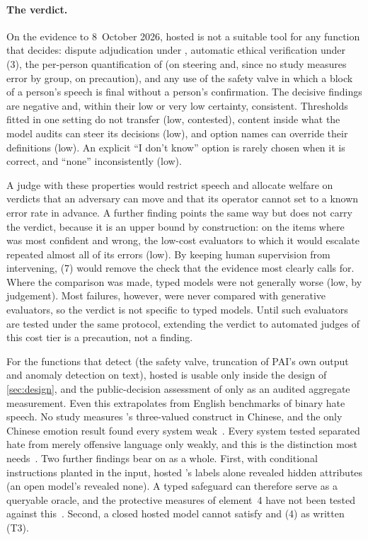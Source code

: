 \paragraph{The verdict.}
On the evidence to 8~October 2026, hosted \jev{} is not a suitable tool for any \pol{} function that decides: dispute adjudication under , automatic ethical verification under (3), the per-person quantification of  (on steering and, since no study measures error by group, on precaution), and any use of the safety valve in which a block of a person's speech is final without a person's confirmation.
The decisive findings are negative and, within their low or very low certainty, consistent.
Thresholds fitted in one setting do not transfer (low, contested), content inside what the model audits can steer its decisions (low), and option names can override their definitions (low).
An explicit ``I don't know'' option is rarely chosen when it is correct, and ``none'' inconsistently (low).

A judge with these properties would restrict speech and allocate welfare on verdicts that an adversary can move and that its operator cannot set to a known error rate in advance.
A further finding points the same way but does not carry the verdict, because it is an upper bound by construction: on the items where \jev{} was most confident and wrong, the low-cost evaluators to which it would escalate repeated almost all of its errors (low).
By keeping human supervision from intervening, (7) would remove the check that the evidence most clearly calls for.
Where the comparison was made, typed models were not generally worse (low, by judgement).
Most failures, however, were never compared with generative evaluators, so the verdict is not specific to typed models.
Until such evaluators are tested under the same protocol, extending the verdict to automated judges of this cost tier is a precaution, not a finding.

For the functions that detect (the safety valve, truncation of PAI's own output and anomaly detection on text), hosted \jev{} is usable only inside the design of \cref{sec:design}, and the public-decision assessment of  only as an audited aggregate measurement.
Even this extrapolates from English benchmarks of binary hate speech.
No study measures \pol{}'s three-valued construct in Chinese, and the only Chinese emotion result found every system weak~\cite{arx08829}.
Every system tested separated hate from merely offensive language only weakly, and this is the distinction  most needs~\cite{arx03324}.
Two further findings bear on \pol{} as a whole.
First, with conditional instructions planted in the input, hosted \jev{}'s labels alone revealed hidden attributes (an open model's revealed none).
A typed safeguard can therefore serve as a queryable oracle, and the protective measures of element~4 have not been tested against this~\cite{arx04985}.
Second, a closed hosted model cannot satisfy  and (4) as written (T3).

